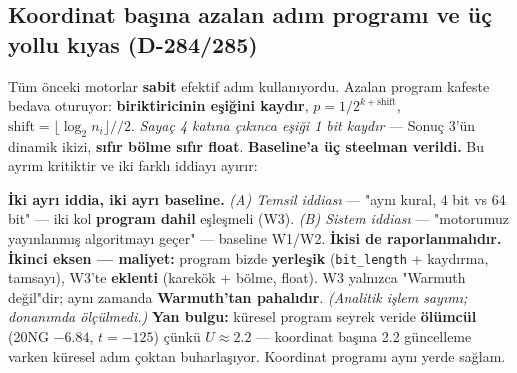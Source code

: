 \documentclass[11pt]{article}
\newenvironment{notkutu}{\def\FrameCommand{\fboxsep=6pt\colorbox{kutu}}\MakeFramed{\advance\hsize-\width\FrameRestore}\small}{\endMakeFramed}
\begin{document}
\subsection*{Koordinat başına azalan adım programı ve üç yollu kıyas (D-284/285)}
Tüm önceki motorlar \textbf{sabit} efektif adım kullanıyordu. Azalan program kafeste bedava oturuyor: \textbf{biriktiricinin eşiğini kaydır}, $p = 1/2^{k+\text{shift}}$, $\text{shift}=\lfloor\log_2 n_i\rfloor//2$. \emph{Sayaç 4 katına çıkınca eşiği 1 bit kaydır} — Sonuç 3'ün dinamik ikizi, \textbf{sıfır bölme sıfır float}.
\textbf{Baseline'a üç steelman verildi.} Bu ayrım kritiktir ve iki farklı iddiayı ayırır:
\begin{center}\small{}\end{center}
\begin{notkutu}\textbf{İki ayrı iddia, iki ayrı baseline.} \emph{(A) Temsil iddiası} — "aynı kural, 4 bit vs 64 bit" — iki kol \textbf{program dahil} eşleşmeli (W3). \emph{(B) Sistem iddiası} — "motorumuz yayınlanmış algoritmayı geçer" — baseline W1/W2. \textbf{İkisi de raporlanmalıdır.}
\end{notkutu}
\textbf{İkinci eksen — maliyet:} program bizde \textbf{yerleşik} (\texttt{bit\_length} + kaydırma, tamsayı), W3'te \textbf{eklenti} (karekök + bölme, float). W3 yalnızca "Warmuth değil"dir; aynı zamanda \textbf{Warmuth'tan pahalıdır}. \emph{(Analitik işlem sayımı; donanımda ölçülmedi.)}
\textbf{Yan bulgu:} küresel program seyrek veride \textbf{ölümcül} (20NG $-6.84$, $t{=}-125$) çünkü $U\approx2.2$ — koordinat başına 2.2 güncelleme varken küresel adım çoktan buharlaşıyor. Koordinat programı aynı yerde sağlam.
\end{document}
